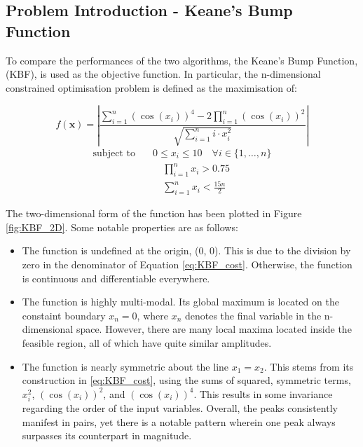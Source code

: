\documentclass[10pt]{article}
\begin{document}
\newpage
\begin{multicols}{2}
\section{Problem Introduction - Keane's Bump Function}
To compare the performances of the two algorithms, the Keane's Bump Function, (KBF), is used as the objective function. In particular, the n-dimensional constrained optimisation problem is defined as the maximisation of:

\begin{equation}
    f(\mathbf{x}) = \left| \frac{\sum_{i=1}^{n} (\cos(x_i))^4 - 2\prod_{i=1}^{n} (\cos(x_i))^2}{\sqrt{\sum_{i=1}^{n} i \cdot x_i^2}} \right|
    \label{eq:KBF_cost}
\end{equation}
\begin{equation}
    \begin{aligned}
        \text{subject to} \quad & 0 \leq x_i \leq 10 \quad \forall i \in \{1, \dots, n\} \\
        & \quad \prod_{i=1}^{n} x_i > 0.75 \\
        & \quad \sum_{i=1}^{n} x_i < \frac{15n}{2}
    \end{aligned} 
    \label{eq:KBF_constraints}
\end{equation}

The two-dimensional form of the function has been plotted in Figure \ref{fig:KBF_2D}. Some notable properties are as follows:

\begin{itemize}
    \item The function is undefined at the origin, (0, 0). This is due to the division by zero in the denominator of Equation \ref{eq:KBF_cost}. Otherwise, the function is continuous and differentiable everywhere.
    \item The function is highly multi-modal. Its global maximum is located on the constaint boundary $x_{n}=0$, where $x_n$ denotes the final variable in the n-dimensional space. However, there are many local maxima located inside the feasible region, all of which have quite similar amplitudes.
    \item The function is nearly symmetric about the line $x_1=x_2$. This stems from its construction in \ref{eq:KBF_cost}, using the sums of squared, symmetric terms, $x_i^2$, $(\cos(x_i))^2$, and $(\cos(x_i))^4$. This results in some invariance regarding the order of the input variables. Overall, the peaks consistently manifest in pairs, yet there is a notable pattern wherein one peak always surpasses its counterpart in magnitude.
\end{itemize}


\end{multicols}
\end{document}
